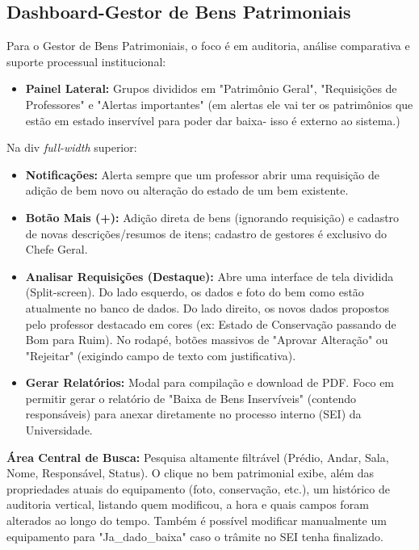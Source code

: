 \subsection{Dashboard-Gestor de Bens Patrimoniais}
Para o Gestor de Bens Patrimoniais, o foco é em auditoria, análise comparativa e suporte processual institucional:
\begin{itemize}
    \item \textbf{Painel Lateral:} Grupos divididos em "Patrimônio Geral", "Requisições de Professores" e "Alertas importantes" (em alertas ele vai ter os patrimônios que estão em estado inservível para poder dar baixa- isso é externo ao sistema.)
\end{itemize}
Na div \textit{full-width} superior:
\begin{itemize}
    \item \textbf{Notificações:} Alerta sempre que um professor abrir uma requisição de adição de bem novo ou alteração do estado de um bem existente.
    \item \textbf{Botão Mais (+):} Adição direta de bens (ignorando requisição) e cadastro de novas descrições/resumos de itens; cadastro de gestores é exclusivo do Chefe Geral.
    \item \textbf{Analisar Requisições (Destaque):} Abre uma interface de tela dividida (Split-screen). Do lado esquerdo, os dados e foto do bem como estão atualmente no banco de dados. Do lado direito, os novos dados propostos pelo professor destacado em cores (ex: Estado de Conservação passando de Bom para Ruim). No rodapé, botões massivos de "Aprovar Alteração" ou "Rejeitar" (exigindo campo de texto com justificativa).
    \item \textbf{Gerar Relatórios:} Modal para compilação e download de PDF. Foco em permitir gerar o relatório de "Baixa de Bens Inservíveis" (contendo responsáveis) para anexar diretamente no processo interno (SEI) da Universidade.
\end{itemize}
\textbf{Área Central de Busca:} Pesquisa altamente filtrável (Prédio, Andar, Sala, Nome, Responsável, Status). O clique no bem patrimonial exibe, além das propriedades atuais do equipamento (foto, conservação, etc.), um histórico de auditoria vertical, listando quem modificou, a hora e quais campos foram alterados ao longo do tempo. Também é possível modificar manualmente um equipamento para "Ja\_dado\_baixa" caso o trâmite no SEI tenha finalizado.

